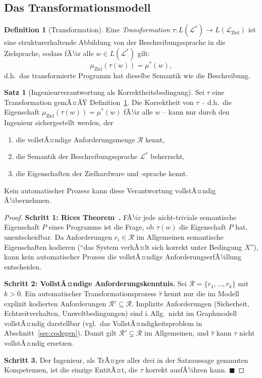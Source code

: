 ﻿\documentclass[a4paper,12pt]{report}
\theoremstyle{definition}
\newtheorem{definition}{Definition}[section]
\newtheorem{satz}{Satz}[section]
\begin{document}
\subsection{Das Transformationsmodell}

\begin{definition}[Transformation]
\label{def:transformation}
Eine \emph{Transformation} $\tau: L(\mathcal{L}^*) \to L(\mathcal{L}_{\text{Ziel}})$
ist eine strukturerhaltende Abbildung von der Beschreibungssprache in die Zielsprache,
sodass fÃ¼r alle $w \in L(\mathcal{L}^*)$ gilt:
\[
  \mu_{\text{Ziel}}(\tau(w)) = \mu^*(w),
\]
d.h.\ das transformierte Programm hat dieselbe Semantik wie die Beschreibung.
\end{definition}

\begin{satz}[Ingenieurverantwortung als Korrektheitsbedingung]
\label{satz:ingverantwortung}
Sei $\tau$ eine Transformation gemÃ¤ÃŸ Definition~\ref{def:transformation}.
Die Korrektheit von $\tau$ -- d.h.\ die Eigenschaft $\mu_{\text{Ziel}}(\tau(w)) = \mu^*(w)$
fÃ¼r alle $w$ -- kann nur durch den Ingenieur sichergestellt werden, der
\begin{enumerate}
  \item die vollstÃ¤ndige Anforderungsmenge $\mathcal{R}$ kennt,
  \item die Semantik der Beschreibungssprache $\mathcal{L}^*$ beherrscht,
  \item die Eigenschaften der Zielhardware und -sprache kennt.
\end{enumerate}
Kein automatischer Prozess kann diese Verantwortung vollstÃ¤ndig Ã¼bernehmen.
\end{satz}

\begin{proof}
\textbf{Schritt 1: Rices Theorem~\cite{rice1953}.}
FÃ¼r jede nicht-triviale semantische Eigenschaft $P$ eines Programms ist die Frage,
ob $\tau(w)$ die Eigenschaft $P$ hat, unentscheidbar. Da Anforderungen
$r_i \in \mathcal{R}$ im Allgemeinen semantische Eigenschaften kodieren
(\enquote{das System verhÃ¤lt sich korrekt unter Bedingung $X$}), kann kein
automatischer Prozess die vollstÃ¤ndige AnforderungserfÃ¼llung entscheiden.

\textbf{Schritt 2: VollstÃ¤ndige Anforderungskenntnis.}
Sei $\mathcal{R} = \{r_1, \ldots, r_k\}$ mit $k > 0$.
Ein automatischer Transformationsprozess $\hat{\tau}$ kennt nur die im Modell
explizit kodierten Anforderungen $\mathcal{R}' \subseteq \mathcal{R}$.
Implizite Anforderungen (Sicherheit, Echtzeitverhalten, Umweltbedingungen) sind
i.\,Allg.\ nicht im Graphmodell vollstÃ¤ndig darstellbar (vgl.\ das VollstÃ¤ndigkeitsproblem
in Abschnitt~\ref{sec:codegen}).
Damit gilt $\mathcal{R}' \subsetneq \mathcal{R}$ im Allgemeinen, und
$\hat{\tau}$ kann $\tau$ nicht vollstÃ¤ndig ersetzen.

\textbf{Schritt 3.}
Der Ingenieur, als TrÃ¤ger aller drei in der Satzaussage genannten Kompetenzen,
ist die einzige EntitÃ¤t, die $\tau$ korrekt ausfÃ¼hren kann. $\blacksquare$
\end{proof}
\end{document}
